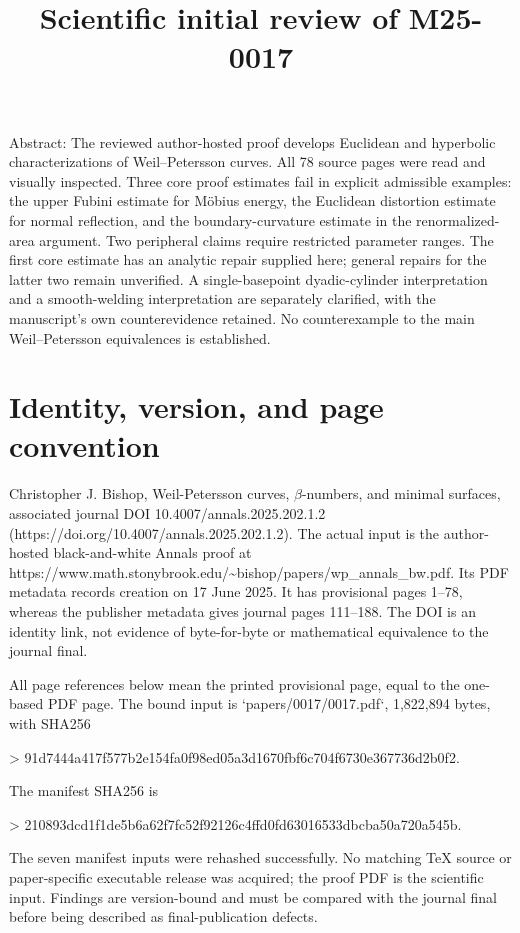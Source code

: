 \documentclass[10pt]{article}
\title{Scientific initial review of M25-0017}
\author{}
\date{}
\begin{document}
\maketitle
Abstract: The reviewed author-hosted proof develops Euclidean and hyperbolic characterizations of Weil–Petersson curves. All 78 source pages were read and visually inspected. Three core proof estimates fail in explicit admissible examples: the upper Fubini estimate for Möbius energy, the Euclidean distortion estimate for normal reflection, and the boundary-curvature estimate in the renormalized-area argument. Two peripheral claims require restricted parameter ranges. The first core estimate has an analytic repair supplied here; general repairs for the latter two remain unverified. A single-basepoint dyadic-cylinder interpretation and a smooth-welding interpretation are separately clarified, with the manuscript’s own counterevidence retained. No counterexample to the main Weil–Petersson equivalences is established.\par
\section*{Identity, version, and page convention}
Christopher J. Bishop, Weil-Petersson curves, \(\beta\)-numbers, and minimal surfaces, associated journal DOI 10.4007/annals.2025.202.1.2 (https://doi.org/10.4007/annals.2025.202.1.2). The actual input is the author-hosted black-and-white Annals proof at https://www.math.stonybrook.edu/\textasciitilde{}bishop/papers/wp\_annals\_bw.pdf. Its PDF metadata records creation on 17 June 2025. It has provisional pages 1–78, whereas the publisher metadata gives journal pages 111–188. The DOI is an identity link, not evidence of byte-for-byte or mathematical equivalence to the journal final.\par
All page references below mean the printed provisional page, equal to the one-based PDF page. The bound input is `papers/0017/0017.pdf`, 1,822,894 bytes, with SHA256\par
> 91d7444a417f577b2e154fa0f98ed05a3d1670fbf6c704f6730e367736d2b0f2.\par
The manifest SHA256 is\par
> 210893dcd1f1de5b6a62f7fc52f92126c4ffd0fd63016533dbcba50a720a545b.\par
The seven manifest inputs were rehashed successfully. No matching TeX source or paper-specific executable release was acquired; the proof PDF is the scientific input. Findings are version-bound and must be compared with the journal final before being described as final-publication defects.\par
\end{document}
